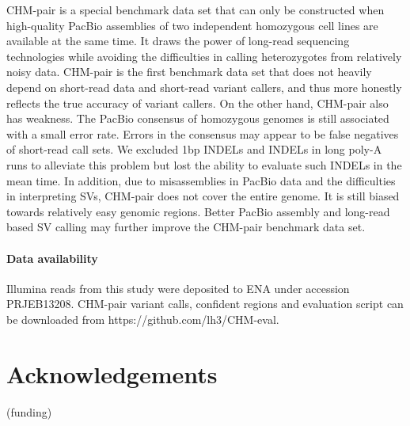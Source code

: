 \documentclass{bioinfo}
\begin{document}
CHM-pair is a special benchmark data set that can only be constructed when
high-quality PacBio assemblies of two independent homozygous cell lines are
available at the same time. It draws the power of long-read sequencing
technologies while avoiding the difficulties in calling heterozygotes from
relatively noisy data. CHM-pair is the first benchmark data set that does not
heavily depend on short-read data and short-read variant callers, and thus more
honestly reflects the true accuracy of variant callers. On the other hand,
CHM-pair also has weakness. The PacBio consensus of homozygous genomes
is still associated with a small error rate. Errors in the consensus may appear
to be false negatives of short-read call sets. We excluded 1bp INDELs and
INDELs in long poly-A runs to alleviate this problem but lost the ability to
evaluate such INDELs in the mean time. In addition, due to misassemblies in
PacBio data and the difficulties in interpreting SVs, CHM-pair does not cover
the entire genome. It is still biased towards relatively easy genomic
regions. Better PacBio assembly and long-read based SV calling may further
improve the CHM-pair benchmark data set.

\paragraph{Data availability\textcolon} Illumina reads from this study were
deposited to ENA under accession PRJEB13208. CHM-pair variant calls, confident
regions and evaluation script can be downloaded from
https://github.com/lh3/CHM-eval.

\section*{Acknowledgements}

(funding)


\end{document}
